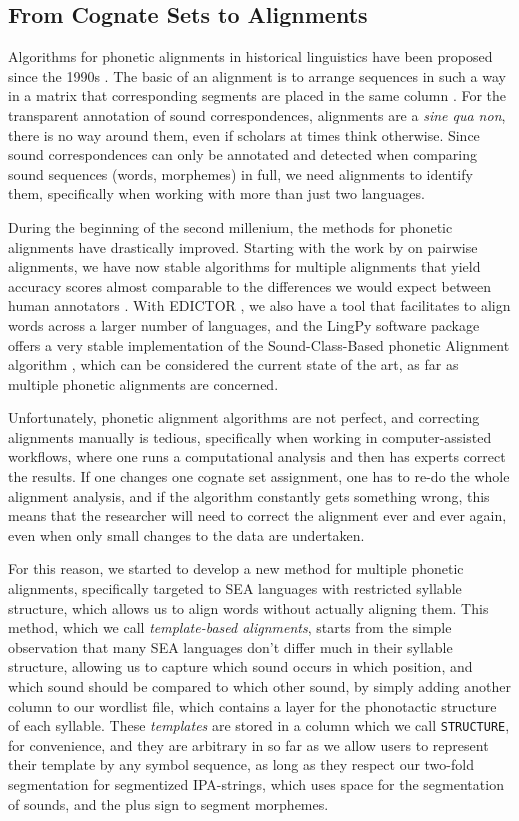 \documentclass[xetex,svgnames]{scrartcl}
\begin{document}
\subsection{From Cognate Sets to Alignments}
Algorithms for phonetic alignments in historical linguistics have been proposed since the 1990s
\citep{Covington1996,Covington1998}. The basic of an alignment is to arrange sequences in such a way
in a matrix
that corresponding segments are placed in the same column \citep{List2018d}. For the transparent
annotation of sound correspondences, alignments are a \emph{sine qua non}, there is no way around
them, even if scholars at times think otherwise. Since sound correspondences can only be annotated
and detected when comparing sound sequences (words, morphemes) in full, we need alignments to
identify them, specifically when working with more than just two languages. 
 
During the beginning of the second millenium, the methods for phonetic alignments have drastically
improved. Starting with the work by \citet{Kondrak2000} on pairwise alignments, we have now stable
algorithms for multiple alignments that yield accuracy scores almost comparable to the
differences we would expect between human annotators \citep{List2014d}. With EDICTOR
\citep{List2017d}, we also have a
tool that facilitates to align words across a larger number of languages, and the LingPy software
package \citep{List2018i} offers a very stable implementation of the Sound-Class-Based phonetic
Alignment algorithm \citep{List2012c}, which can be considered the current state of the art, as far
as multiple phonetic alignments are concerned.
 
Unfortunately, phonetic alignment algorithms are not perfect, and correcting alignments manually is
tedious, specifically when working in computer-assisted workflows, where one runs a computational
analysis and then has experts correct the results. If one changes one cognate set assignment, one
has to re-do the whole alignment analysis, and if the algorithm constantly gets something wrong,
this means that the researcher will need to correct the alignment ever and ever again, even when
only small changes to the data are undertaken. 
 
For this reason, we started to develop a new method for multiple phonetic alignments, specifically
targeted to SEA languages with restricted syllable structure, which allows us to align words without
actually aligning them. This method, which we call \emph{template-based alignments}, starts from the
simple observation that many SEA languages don't differ much in their syllable structure, allowing
us to capture which sound occurs in which position, and which sound should be compared to which
other sound, by simply adding another column to our wordlist file, which contains a layer for the
phonotactic structure of each syllable. These \emph{templates} are stored in a column which we call
\texttt{STRUCTURE}, for convenience, and they are arbitrary in so far as we allow users to represent
their template by any symbol sequence, as long as they respect our two-fold segmentation for
segmentized IPA-strings, which uses space for the segmentation of sounds, and the plus sign to
segment morphemes. 
 
\end{document}
